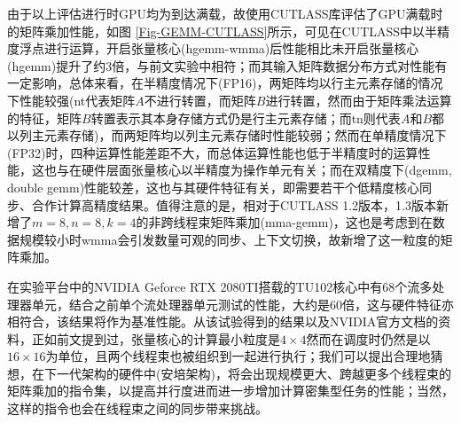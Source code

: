 \par 由于以上评估进行时GPU均为到达满载，故使用CUTLASS库评估了GPU满载时的矩阵乘加性能，如图 \ref{Fig-GEMM-CUTLASS}所示，可见在CUTLASS中以半精度浮点进行运算，开启张量核心(hgemm-wmma)后性能相比未开启张量核心(hgemm)提升了约3倍，与前文实验中相符；而其输入矩阵数据分布方式对性能有一定影响，总体来看，在半精度情况下(FP16)，两矩阵均以行主元素存储的情况下性能较强(nt代表矩阵$ A $不进行转置，而矩阵$ B $进行转置，然而由于矩阵乘法运算的特征，矩阵$ B $转置表示其本身存储方式仍是行主元素存储；而tn则代表$ A $和$ B $都以列主元素存储)，而两矩阵均以列主元素存储时性能较弱；然而在单精度情况下(FP32)时，四种运算性能差距不大，而总体运算性能也低于半精度时的运算性能，这也与在硬件层面张量核心以半精度为操作单元有关；而在双精度下(dgemm, double gemm)性能较差，这也与其硬件特征有关，即需要若干个低精度核心同步、合作计算高精度结果。值得注意的是，相对于CUTLASS 1.2版本，1.3版本新增了$ m=8,n=8,k=4 $的非跨线程束矩阵乘加(mma-gemm)，这也是考虑到在数据规模较小时wmma会引发数量可观的同步、上下文切换，故新增了这一粒度的矩阵乘加。
\par 在实验平台中的NVIDIA Geforce RTX 2080TI搭载的TU102核心中有68个流多处理器单元\cite{2080TI}，结合之前单个流处理器单元测试的性能，大约是60倍，这与硬件特征亦相符合，该结果将作为基准性能。从该试验得到的结果以及NVIDIA官方文档的资料，正如前文提到过，张量核心的计算最小粒度是$ 4\times 4 $然而在调度时仍然是以$ 16\times 16 $为单位，且两个线程束也被组织到一起进行执行；我们可以提出合理地猜想，在下一代架构的硬件中(安培架构)，将会出现规模更大、跨越更多个线程束的矩阵乘加的指令集，以提高并行度进而进一步增加计算密集型任务的性能；当然，这样的指令也会在线程束之间的同步带来挑战。

